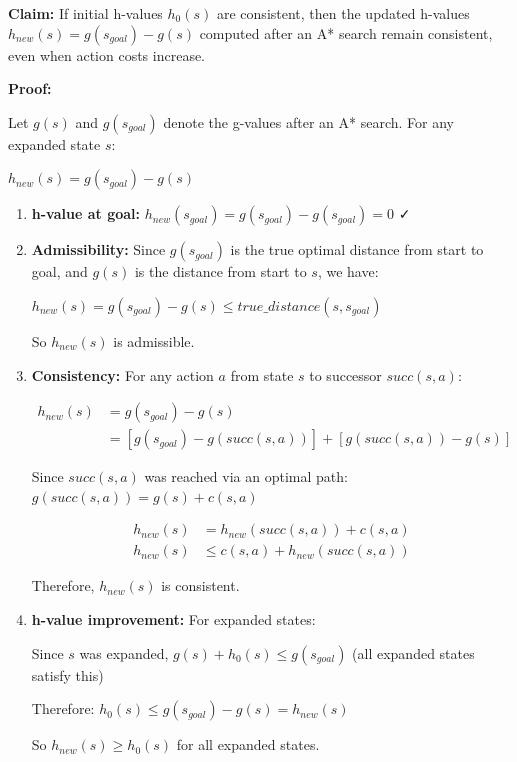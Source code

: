 \documentclass[12pt]{article}
\begin{document}
\textbf{Claim:} If initial h-values $h_0(s)$ are consistent, then the updated h-values 
$h_{new}(s) = g(s_{goal}) - g(s)$ computed after an A* search remain consistent, even when 
action costs increase.

\textbf{Proof:}

Let $g(s)$ and $g(s_{goal})$ denote the g-values after an A* search. For any expanded state $s$:

$h_{new}(s) = g(s_{goal}) - g(s)$

\begin{enumerate}
    \item \textbf{h-value at goal:} $h_{new}(s_{goal}) = g(s_{goal}) - g(s_{goal}) = 0$ ✓
    
    \item \textbf{Admissibility:} Since $g(s_{goal})$ is the true optimal distance from start to 
    goal, and $g(s)$ is the distance from start to $s$, we have:
    
    $h_{new}(s) = g(s_{goal}) - g(s) \leq true\_distance(s, s_{goal})$
    
    So $h_{new}(s)$ is admissible.
    
    \item \textbf{Consistency:} For any action $a$ from state $s$ to successor $succ(s,a)$:
    
    \begin{align*}
    h_{new}(s) &= g(s_{goal}) - g(s) \\
    &= [g(s_{goal}) - g(succ(s,a))] + [g(succ(s,a)) - g(s)]
    \end{align*}
    
    Since $succ(s,a)$ was reached via an optimal path: $g(succ(s,a)) = g(s) + c(s,a)$
    
    \begin{align*}
    h_{new}(s) &= h_{new}(succ(s,a)) + c(s,a) \\
    h_{new}(s) &\leq c(s,a) + h_{new}(succ(s,a))
    \end{align*}
    
    Therefore, $h_{new}(s)$ is consistent.
    
    \item \textbf{h-value improvement:} For expanded states:
    
    Since $s$ was expanded, $g(s) + h_0(s) \leq g(s_{goal})$ (all expanded states satisfy this)
    
    Therefore: $h_0(s) \leq g(s_{goal}) - g(s) = h_{new}(s)$
    
    So $h_{new}(s) \geq h_0(s)$ for all expanded states.
\end{enumerate}
\end{document}

